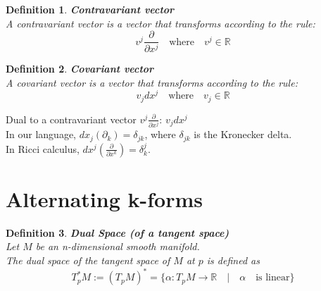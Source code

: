 \documentclass[11pt]{book} %
\newtheorem{definition}{Definition}[section]
\begin{document}
\begin{definition}{\textbf{Contravariant vector}} \\
    A contravariant vector is a vector that transforms according to the rule: \\
    \begin{equation*}
        v^j \frac{\partial}{\partial x^j} \quad \text{where} \quad v^j \in \mathbb{R}
    \end{equation*}
\end{definition}

\begin{definition}{\textbf{Covariant vector}} \\
    A covariant vector is a vector that transforms according to the rule: \\
    \begin{equation*}
        v_j dx^j \quad \text{where} \quad v_j \in \mathbb{R}
    \end{equation*}
\end{definition}

Dual to a contravariant vector $v^j \frac{\partial}{\partial x^j}$: $v_j dx^j$\\
In our language, $dx_j(\partial_k) = \delta_{jk}$, where $\delta_{jk}$ is the Kronecker delta.\\
In Ricci calculus, $dx^j(\frac{\partial}{\partial x^k}) = \delta^j_k$.




\section{Alternating k-forms}

\begin{definition}{\textbf{Dual Space (of a tangent space)}} \\
    Let \( M \) be an n-dimensional smooth manifold. \\
    The dual space of the tangent space of \( M \) at \( p \) is defined as
    \begin{equation*}
        T_p^*M := (T_pM)^* = \{ \alpha : T_pM \to \mathbb{R} \quad | \quad \alpha \quad \text{is linear} \}
    \end{equation*}
\end{definition}
\end{document}
